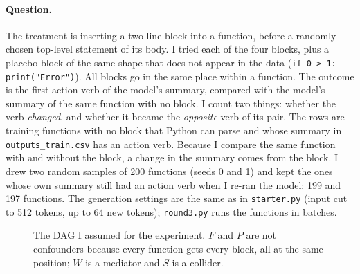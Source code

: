 \documentclass{article}
\newcommand{\code}[1]{\texttt{#1}}
\begin{document}
\paragraph{Question.} The treatment is inserting a two-line block into a function, before a randomly
chosen top-level statement of its body. I tried each of the four blocks, plus a placebo block of the
same shape that does not appear in the data (\code{if 0 > 1: print("Error")}). All blocks go in the
same place within a function. The outcome is the first action verb of the model's summary,
compared with the model's summary of the same function with no block. I count two things:
whether the verb \emph{changed}, and whether it became the \emph{opposite} verb of its pair. The rows
are training functions with no block that Python can parse and whose summary in
\code{outputs\_train.csv} has an action verb. Because I compare the same function with and without the
block, a change in the summary comes from the block. I drew two random samples of 200 functions
(seeds 0 and 1) and kept the ones whose own summary still had an action verb when I re-ran the
model: 199 and 197 functions. The generation settings are the same as in \code{starter.py} (input cut
to 512 tokens, up to 64 new tokens); \code{round3.py} runs the functions in batches.

\begin{figure}[ht]
\centering
{}
\caption{The DAG I assumed for the experiment. $F$ and $P$ are not confounders because every function
gets every block, all at the same position; $W$ is a mediator and $S$ is a collider.}
\label{fig:dag}
\end{figure}
\end{document}
